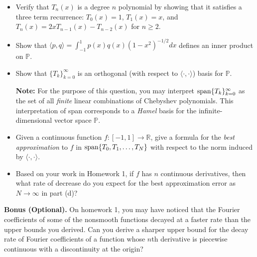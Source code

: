 \documentclass[12pt]{article}
\begin{document}
\begin{itemize}

	\item[\textbf{(a)}] Verify that $T_n(x)$ is a degree $n$ polynomial by showing that it satisfies a three term recurrence: $T_0(x)=1$, $T_1(x)=x$, and $T_n(x) = 2xT_{n-1}(x) - T_{n-2}(x)$ for $n\geq 2$. 

	\item[\textbf{(b)}] Show that $\langle p,q\rangle=\int_{-1}^1p(x)q(x)(1-x^2)^{-1/2}dx$ defines an inner product on $\mathbb{P}$. 
    
	\item[\textbf{(c)}] Show that $\{T_k\}_{k=0}^\infty$ is an orthogonal (with respect to $\langle\cdot,\cdot\rangle$) basis for $\mathbb{P}$.

    \noindent
    \textbf{Note:} For the purpose of this question, you may interpret ${\rm span}\{T_k\}_{k=0}^\infty$ as the set of all \textit{finite} linear combinations of Chebyshev polynomials. This interpretation of span corresponds to a \textit{Hamel} basis for the infinite-dimensional vector space $\mathbb{P}$.

	\item[\textbf{(d)}] Given a continuous function $f:[-1,1]\rightarrow\mathbb{R}$, give a formula for the \textit{best approximation} to $f$ in ${\rm span}\{T_0,T_1,\ldots,T_N\}$ with respect to the norm induced by $\langle\cdot,\cdot\rangle$.

	\item[\textbf{(e)}] Based on your work in Homework 1, if $f$ has $n$ continuous derivatives, then what rate of decrease do you expect for the best approximation error as $N\rightarrow\infty$ in part (d)?

\end{itemize}

\noindent
\textbf{Bonus (Optional).} On homework 1, you may have noticed that the Fourier coefficients of some of the nonsmooth functions decayed at a faster rate than the upper bounds you derived. Can you derive a sharper upper bound for the decay rate of Fourier coefficients of a function whose $n$th derivative is piecewise continuous with a discontinuity at the origin? 

\color{Black}
\end{document}
